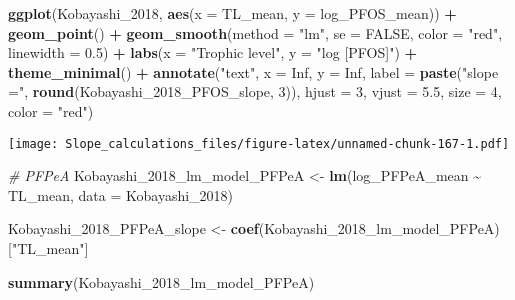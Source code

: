 \documentclass[
]{article}
\newenvironment{Shaded}{\begin{snugshade}}{\end{snugshade}}
\newcommand{\AttributeTok}[1]{\textcolor[rgb]{0.13,0.29,0.53}{#1}}
\newcommand{\CommentTok}[1]{\textcolor[rgb]{0.56,0.35,0.01}{\textit{#1}}}
\newcommand{\ConstantTok}[1]{\textcolor[rgb]{0.56,0.35,0.01}{#1}}
\newcommand{\DecValTok}[1]{\textcolor[rgb]{0.00,0.00,0.81}{#1}}
\newcommand{\FloatTok}[1]{\textcolor[rgb]{0.00,0.00,0.81}{#1}}
\newcommand{\FunctionTok}[1]{\textcolor[rgb]{0.13,0.29,0.53}{\textbf{#1}}}
\newcommand{\NormalTok}[1]{#1}
\newcommand{\OtherTok}[1]{\textcolor[rgb]{0.56,0.35,0.01}{#1}}
\newcommand{\SpecialCharTok}[1]{\textcolor[rgb]{0.81,0.36,0.00}{\textbf{#1}}}
\newcommand{\StringTok}[1]{\textcolor[rgb]{0.31,0.60,0.02}{#1}}
\begin{document}
\begin{Shaded}
\begin{Highlighting}[]
\FunctionTok{ggplot}\NormalTok{(Kobayashi\_2018, }\FunctionTok{aes}\NormalTok{(}\AttributeTok{x =}\NormalTok{ TL\_mean, }\AttributeTok{y =}\NormalTok{ log\_PFOS\_mean)) }\SpecialCharTok{+}
  \FunctionTok{geom\_point}\NormalTok{() }\SpecialCharTok{+}
  \FunctionTok{geom\_smooth}\NormalTok{(}\AttributeTok{method =} \StringTok{"lm"}\NormalTok{, }\AttributeTok{se =} \ConstantTok{FALSE}\NormalTok{, }\AttributeTok{color =} \StringTok{"red"}\NormalTok{, }\AttributeTok{linewidth =} \FloatTok{0.5}\NormalTok{) }\SpecialCharTok{+}
  \FunctionTok{labs}\NormalTok{(}\AttributeTok{x =} \StringTok{"Trophic level"}\NormalTok{,}
       \AttributeTok{y =} \StringTok{"log [PFOS]"}\NormalTok{) }\SpecialCharTok{+}
  \FunctionTok{theme\_minimal}\NormalTok{() }\SpecialCharTok{+}
  \FunctionTok{annotate}\NormalTok{(}\StringTok{"text"}\NormalTok{, }\AttributeTok{x =} \ConstantTok{Inf}\NormalTok{, }\AttributeTok{y =} \ConstantTok{Inf}\NormalTok{, }\AttributeTok{label =} \FunctionTok{paste}\NormalTok{(}\StringTok{"slope ="}\NormalTok{, }\FunctionTok{round}\NormalTok{(Kobayashi\_2018\_PFOS\_slope, }\DecValTok{3}\NormalTok{)), }
           \AttributeTok{hjust =} \DecValTok{3}\NormalTok{, }\AttributeTok{vjust =} \FloatTok{5.5}\NormalTok{, }\AttributeTok{size =} \DecValTok{4}\NormalTok{, }\AttributeTok{color =} \StringTok{"red"}\NormalTok{)}
\end{Highlighting}
\end{Shaded}

\texttt{[image: Slope\_calculations\_files/figure-latex/unnamed-chunk-167-1.pdf]}

\begin{Shaded}
\begin{Highlighting}[]
\CommentTok{\# PFPeA}
\NormalTok{Kobayashi\_2018\_lm\_model\_PFPeA }\OtherTok{\textless{}{-}} \FunctionTok{lm}\NormalTok{(log\_PFPeA\_mean }\SpecialCharTok{\textasciitilde{}}\NormalTok{ TL\_mean,}
                                    \AttributeTok{data =}\NormalTok{ Kobayashi\_2018)}

\NormalTok{Kobayashi\_2018\_PFPeA\_slope }\OtherTok{\textless{}{-}} \FunctionTok{coef}\NormalTok{(Kobayashi\_2018\_lm\_model\_PFPeA)[}\StringTok{"TL\_mean"}\NormalTok{]}

\FunctionTok{summary}\NormalTok{(Kobayashi\_2018\_lm\_model\_PFPeA)}
\end{Highlighting}
\end{Shaded}
\end{document}
